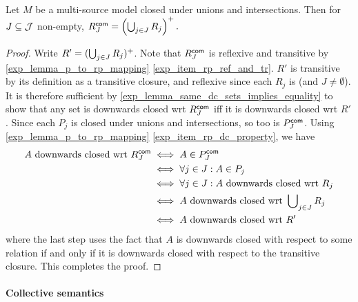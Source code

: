 \begin{proposition}
\label{exp_prop_rcommon}
Let $M$ be a multi-source model closed under unions and intersections.
Then for $J \subseteq \mathcal{J}$ non-empty,
$
R^{\mathsf{com}}_J = \left(
  \bigcup\nolimits_{j \in J}{R_j}
\right)^{+}.$
\end{proposition}
\begin{proof}

    Write $R' = (\bigcup_{j \in J}{R_j})^{+}$. Note that $R^{\mathsf{com}}_J$ is
    reflexive and transitive by \cref{exp_lemma_p_to_rp_mapping}
    \cref{exp_item_rp_ref_and_tr}. $R'$ is transitive by its definition as a
    transitive closure, and reflexive since each $R_j$ is (and $J \ne
    \emptyset$).
    It is therefore sufficient by
\cref{exp_lemma_same_dc_sets_implies_equality} to show that any set
is downwards closed wrt $R^{\mathsf{com}}_J$ iff it is
downwards closed wrt $R'$. Since each $P_j$ is closed under
unions and intersections, so too is $P^{\mathsf{com}}_J$. Using
\cref{exp_lemma_p_to_rp_mapping} \cref{exp_item_rp_dc_property}, we have
\[
\begin{aligned}
   A \text{ downwards closed wrt } R^{\mathsf{com}}_J
   &\iff A \in P^{\mathsf{com}}_J \\
   &\iff \forall j \in J: A \in P_j \\
   &\iff \forall j \in J: A \text{ downwards closed wrt } R_j \\
   &\iff A \text{ downwards closed wrt } \bigcup\nolimits_{j \in J}{R_j} \\
   &\iff A \text{ downwards closed wrt } R'
\end{aligned}\]
where the last step uses the fact that $A$ is downwards closed with respect to
some relation if and only if it is downwards closed with respect to the
transitive closure. This completes the proof.
\end{proof}

\paragraph{Collective semantics}

